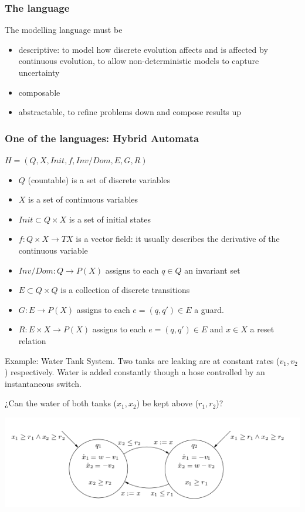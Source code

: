 \documentclass{beamer}
\begin{document}
\begin{frame}
\frametitle{The language}
	The modelling language must be
\begin{itemize}
	\item descriptive: to model how discrete evolution affects and is affected by continuous evolution, to allow non-deterministic models to capture uncertainty
	\item composable
	\item abstractable, to refine problems down and compose results up
\end{itemize}

\end{frame}

\begin{frame}
	\frametitle{One of the languages: Hybrid Automata}
	$H = (Q, X, Init, f, Inv/Dom, E, G, R)$ %
	
	\begin{itemize}
		\item $Q$ (countable) is a set of discrete variables
		\item $X$ is a set of continuous variables
		\item $Init \subset Q \times X$ is a set of initial states
		\item $f: Q \times X \rightarrow TX$ is a vector field: it usually describes the derivative of the continuous variable
		\item $Inv/Dom: Q \rightarrow P(X)$ assigns to each $q \in Q$ an invariant set
		\item $E \subset Q \times Q$ is a collection of discrete transitions
		\item $G : E \rightarrow P(X)$ assigns to each $e=(q,q') \in E$ a guard.
		\item $R : E \times X \rightarrow P(X)$ assigns to each $e = (q,q') \in E$ and $x \in X$ a reset relation
	\end{itemize}
	
Example: Water Tank System. Two tanks are leaking are at constant rates ($v_1,v_2$) respectively. Water is added constantly though a hose controlled by an instantaneous switch.

¿Can the water of both tanks ($x_1,x_2$) be kept above ($r_1,r_2$)?
\end{frame}

\begin{frame}
\includegraphics[scale=0.8]{tank_system.png}
\end{frame}
\end{document}
